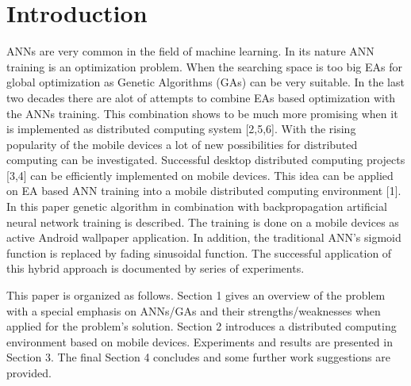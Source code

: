 \documentclass{llncs}
\begin{document}
\section{Introduction}
%
ANNs are very common in the field of machine learning. In its nature ANN training is an optimization problem. When the searching space is too big EAs for global optimization as Genetic Algorithms (GAs) can be very suitable. In the last two decades there are alot of attempts to combine EAs based optimization with the ANNs training. This combination shows to be much more promising when it is implemented as distributed computing system [2,5,6]. With the rising popularity of the mobile devices a lot of new possibilities for distributed computing can be investigated. Successful desktop distributed computing projects [3,4] can be efficiently implemented on mobile devices. This idea can be applied on EA based ANN training into a mobile distributed computing environment [1]. In this paper genetic algorithm in combination with backpropagation artificial neural network training is described. The training is done on a mobile devices as active Android wallpaper application. In addition, the traditional ANN's sigmoid function is replaced by fading sinusoidal function. The successful application of this hybrid approach is documented by series of experiments.

This paper is organized as follows. Section 1 gives an overview of the problem  with a special emphasis on ANNs/GAs and their strengths/weaknesses when applied for the problem's solution. Section 2 introduces a distributed computing environment based on mobile devices. Experiments and results are presented in Section 3. The final Section 4 concludes and some further work suggestions are provided. 
%
\end{document}
